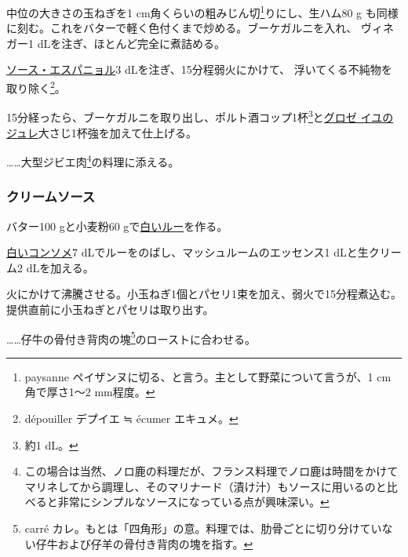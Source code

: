 \begin{recette}
中位の大きさの玉ねぎを1 cm角くらいの粗みじん切\footnote{paysanne
  ペイザンヌに切る、と言う。主として野菜について言うが、1 cm角で厚さ1〜2
  mm程度。}りにし、生ハム80 g
も同様に刻む。これをバターで軽く色付くまで炒める。ブーケガルニを入れ、
ヴィネガー1\undemi{} dLを注ぎ、ほとんど完全に煮詰める。

\protect\hyperlink{sauce-espagnole}{ソース・エスパニョル}3
dLを注ぎ、15分程弱火にかけて、 浮いてくる不純物を取り除く\footnote{dépouiller
  デプイエ ≒ écumer エキュメ。}。

15分経ったら、ブーケガルニを取り出し、ポルト酒コップ1杯\footnote{約1
  dL。}と\protect\hyperlink{}{グロゼ
イユのジュレ}大さじ1杯強を加えて仕上げる。

\ldots{}\ldots{}大型ジビエ肉\footnote{この場合は当然、ノロ鹿の料理だが、フランス料理でノロ鹿は時間をかけてマリネしてから調理し、そのマリナード（漬け汁）もソースに用いるのと比べると非常にシンプルなソースになっている点が興味深い。}の料理に添える。

\maeaki

\hypertarget{cream-sauce}{%
\subsubsection{クリームソース}\label{cream-sauce}}



バター100 gと小麦粉60
gで\protect\hyperlink{roux-blanc}{白いルー}を作る。

\protect\hyperlink{consomme-blanc}{白いコンソメ}7
dLでルーをのばし、マッシュルームのエッセンス1 dLと生クリーム2
dLを加える。

火にかけて沸騰させる。小玉ねぎ1個とパセリ1束を加え、弱火で15分程煮込む。提供直前に小玉ねぎとパセリは取り出す。

\ldots{}\ldots{}仔牛の骨付き背肉の塊\footnote{carré
  カレ。もとは「四角形」の意。料理では、肋骨ごとに切り分けていない仔牛および仔羊の骨付き背肉の塊を指す。}のローストに合わせる。


\end{recette}
